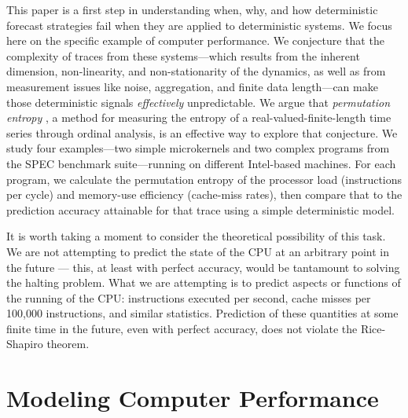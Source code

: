 \documentclass{article}
\begin{document}
This paper is a first step in understanding when, why, and how
deterministic forecast strategies fail when they are applied to
deterministic systems.  We focus here on the specific example of
computer performance.  We conjecture that the complexity of traces
from these systems---which results from the inherent dimension,
non-linearity, and non-stationarity of the dynamics, as well as from
measurement issues like noise, aggregation, and finite data
length---can make those deterministic signals \emph{effectively}
unpredictable.  We argue that \emph{permutation entropy}
\cite{bandt2002per}, a method for measuring the entropy of a
real-valued-finite-length time series through ordinal analysis, is an
effective way to explore that conjecture.  We study four
examples---two simple microkernels and two complex programs from the
SPEC benchmark suite---running on different Intel-based machines.  For
each program, we calculate the permutation entropy of the processor
load (instructions per cycle) and memory-use efficiency (cache-miss
rates), then compare that to the prediction accuracy attainable for
that trace using a simple deterministic model.

It is worth taking a moment to consider the theoretical possibility of
this task. We are not attempting to predict the state of the CPU at an
arbitrary point in the future --- this, at least with perfect
accuracy, would be tantamount to solving the halting problem. What we
are attempting is to predict aspects or functions of the running of
the CPU: instructions executed per second, cache misses per 100,000
instructions, and similar statistics. Prediction of these quantities
at some finite time in the future, even with perfect accuracy, does
not violate the Rice-Shapiro theorem.


\section{Modeling Computer Performance}\label{sec:compModel}
\end{document}
